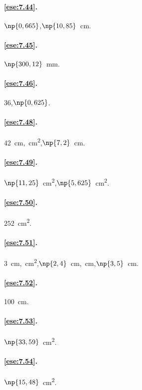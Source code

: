 \paragraph{\ref{ese:7.44}.}
$\np{0,665}$,\quad $\np{10,85}$~cm.

\paragraph{\ref{ese:7.45}.}
$\np{300,12}$~mm.

\paragraph{\ref{ese:7.46}.}
36,\quad $\np{0,625}$.

\paragraph{\ref{ese:7.48}.}
42~cm,~cm\textsuperscript{2},\quad $\np{7,2}$~cm.

\paragraph{\ref{ese:7.49}.}
$\np{11,25}$~cm\textsuperscript{2},\quad $\np{5,625}$~cm\textsuperscript{2}.

\paragraph{\ref{ese:7.50}.}
$252$~cm\textsuperscript{2}.

\paragraph{\ref{ese:7.51}.}
3~cm,~cm\textsuperscript{2},\quad $\np{2,4}$~cm,~cm,\quad $\np{3,5}$~cm.

\paragraph{\ref{ese:7.52}.}
100~cm.

\paragraph{\ref{ese:7.53}.}
$\np{33,59}$~cm\textsuperscript{2}.

\paragraph{\ref{ese:7.54}.}
$\np{15,48}$~cm\textsuperscript{2}.

